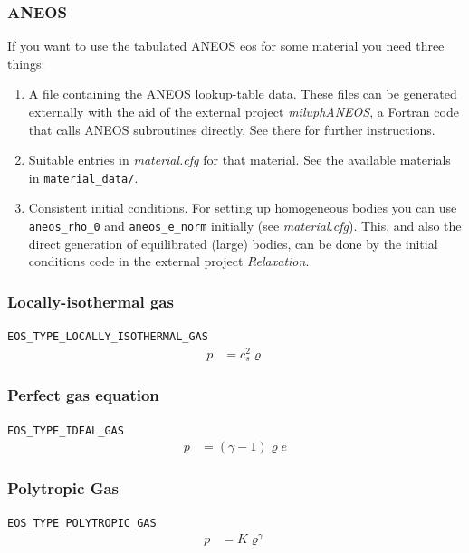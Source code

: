 \documentclass[10pt,fleqn,twoside]{article}
\begin{document}
\subsubsection{ANEOS}
If you want to use the tabulated ANEOS eos for some material you need three things:
\begin{enumerate}
 \item A file containing the ANEOS lookup-table data. These files can be generated externally with the aid of the external project \emph{miluphANEOS}, a Fortran code that calls ANEOS subroutines directly. See there for further instructions.
 \item Suitable entries in \emph{material.cfg} for that material. See the available materials in \verb|material_data/|.
 \item Consistent initial conditions. For setting up homogeneous bodies you can use \verb|aneos_rho_0| and \verb|aneos_e_norm| initially (see \emph{material.cfg}). This, and also the direct generation of equilibrated (large) bodies, can be done by the initial conditions code in the external project \emph{Relaxation}.
\end{enumerate}
\subsubsection{Locally-isothermal gas}
\texttt{EOS\_TYPE\_LOCALLY\_ISOTHERMAL\_GAS}
\begin{align}
 p & = c_s^2 \varrho
\end{align}
\subsubsection{Perfect gas equation}
\texttt{EOS\_TYPE\_IDEAL\_GAS}
\begin{align}
 p & = (\gamma-1) \varrho e
\end{align}
\subsubsection{Polytropic Gas}
\texttt{EOS\_TYPE\_POLYTROPIC\_GAS}
\begin{align}
 p & = K \varrho^\gamma
\end{align}
\end{document}
